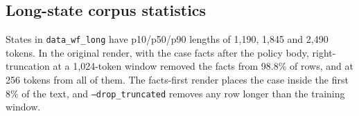 \subsection{Long-state corpus statistics}
\label{app:long-state-stats}

States in \texttt{data\_wf\_long} have p10/p50/p90 lengths of 1{,}190, 1{,}845 and 2{,}490 tokens. In the
original render, with the case facts after the policy body, right-truncation at a 1{,}024-token window
removed the facts from 98.8\% of rows, and at 256 tokens from all of them. The facts-first render places
the case inside the first 8\% of the text, and \texttt{--drop\_truncated} removes any row longer than the
training window.
